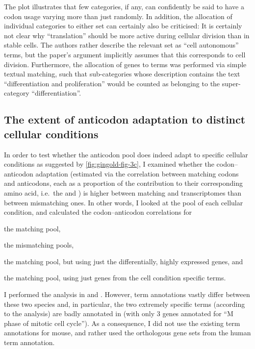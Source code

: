 The plot illustrates that few \go categories, if any, can confidently be said to
have a codon usage varying more than just randomly. In addition, the allocation
of individual \go categories to either set can certainly also be criticised: It
is certainly not clear why “translation” should be more active during cellular
division than in stable cells. The authors rather describe the relevant set as
“cell autonomous” \go terms, but the paper’s argument implicitly assumes that
this corresponds to cell division. Furthermore, the allocation of genes to \go
terms was performed via simple textual matching, such that \go sub-categories
whose description contains the text “differentiation and proliferation” would be
counted as belonging to the \go super-category “differentiation”.

\subsection{The extent of anticodon adaptation to distinct cellular conditions}

In order to test whether the anticodon pool does indeed adapt to specific
cellular conditions as suggested by \cref{fig:gingold-fig-3c}, I examined
whether the codon--anticodon adaptation (estimated via the correlation between
matching codons and anticodons, each as a proportion of the contribution to
their corresponding amino acid, i.e.\ the \cub and \aab) is higher between
matching \mrna and \trna transcriptomes than between mismatching ones. In other
words, I looked at the \mrna pool of each cellular condition, and calculated the
codon--anticodon correlations for
\begin{enumerate*}
    \item the matching \trna pool,
    \item the mismatching \trna pools,
    \item the matching \trna pool, but using just the differentially, highly
        expressed \mrna genes, and
    \item the matching \trna pool, using just genes from the cell condition
        specific \go terms.
\end{enumerate*}

I performed the analysis in \mmu and \hsa. However, \go term annotations vastly
differ between these two species and, in particular, the two extremely specific
\go terms (according to the \pca analysis) are badly annotated in \mmu (with
only \num{3} genes annotated for “M phase of mitotic cell cycle”). As a
consequence, I did not use the existing \go term annotations for mouse, and
rather used the orthologous gene sets from the human \go term annotation.

